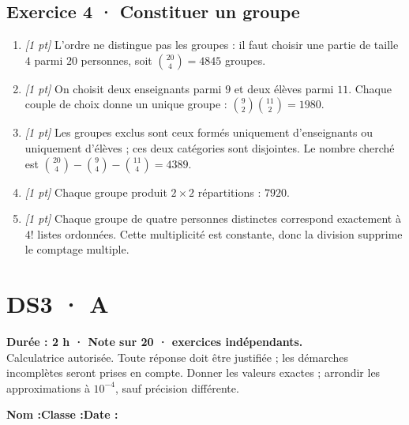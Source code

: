 \subsection*{Exercice 4 · Constituer un groupe}\begin{enumerate}

\item \textit{[1 pt]} L'ordre ne distingue pas les groupes : il faut choisir une partie de taille $4$ parmi $20$ personnes, soit $\binom{20}4=4845$ groupes.

\item \textit{[1 pt]} On choisit deux enseignants parmi $9$ et deux élèves parmi $11$. Chaque couple de choix donne un unique groupe : $\binom{9}2\binom{11}2=1980$.

\item \textit{[1 pt]} Les groupes exclus sont ceux formés uniquement d'enseignants ou uniquement d'élèves ; ces deux catégories sont disjointes. Le nombre cherché est $\binom{20}4-\binom{9}4-\binom{11}4=4389$.

\item \textit{[1 pt]} Chaque groupe produit $2\times2$ répartitions : $7920$.

\item \textit{[1 pt]} Chaque groupe de quatre personnes distinctes correspond exactement à $4!$ listes ordonnées. Cette multiplicité est constante, donc la division supprime le comptage multiple.

\end{enumerate}

\fi

\ifmxteacher

\mxnewpage{}\label{sujet:4-3}

\section*{DS3 · A}


\textbf{Durée : 2 h · Note sur 20 ·  exercices indépendants.}\\Calculatrice autorisée. Toute réponse doit être justifiée ; les démarches incomplètes seront prises en compte. Donner les valeurs exactes ; arrondir les approximations à $10^{-4}$, sauf précision différente.

\smallskip\textbf{Nom :}\enspace\dotfill\quad\textbf{Classe :}\enspace\dotfill\quad\textbf{Date :}\enspace\dotfill

